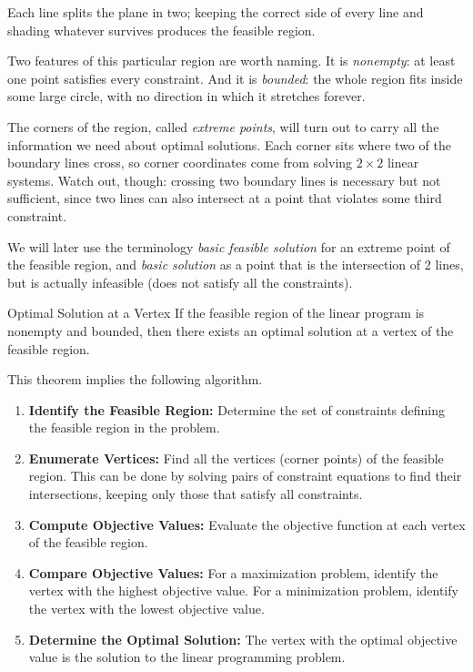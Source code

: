 Each line splits the plane in two; keeping the correct side of every line and shading whatever survives produces the feasible region.

Two features of this particular region are worth naming.  It is \emph{nonempty}: at least one point satisfies every constraint.  And it is \emph{bounded}: the whole region fits inside some large circle, with no direction in which it stretches forever.

The corners of the region, called \emph{extreme points}, will turn out to carry all the information we need about optimal solutions.  Each corner sits where two of the boundary lines cross, so corner coordinates come from solving $2 \times 2$ linear systems.  Watch out, though: crossing two boundary lines is necessary but not sufficient, since two lines can also intersect at a point that violates some third constraint.

We will later use the terminology \emph{basic feasible solution} for an extreme point of the feasible region, and \emph{basic solution} as a point that is the intersection of 2 lines, but is actually infeasible (does not satisfy all the constraints).

\begin{theorem}{Optimal Solution at a Vertex}\label{thm:optimalextremepoint}
If the feasible region of the linear program is nonempty and bounded, then there exists an optimal solution at a vertex of the feasible region.
\end{theorem}

This theorem implies the following algorithm.
\begin{algorithm}[H]
\caption{Enumerate Vertices Algorithm for Solving a Linear Programming Problem}
\label{alg:EnumerateVertices}
\begin{enumerate}
    \item \textbf{Identify the Feasible Region:}
    Determine the set of constraints defining the feasible region in the problem.
    \item \textbf{Enumerate Vertices:}
    Find all the vertices (corner points) of the feasible region. This can be done by solving pairs of constraint equations to find their intersections, keeping only those that satisfy all constraints.
    \item \textbf{Compute Objective Values:}
    Evaluate the objective function at each vertex of the feasible region.
    \item \textbf{Compare Objective Values:}
    For a maximization problem, identify the vertex with the highest objective value. For a minimization problem, identify the vertex with the lowest objective value.
    \item \textbf{Determine the Optimal Solution:}
    The vertex with the optimal objective value is the solution to the linear programming problem.
\end{enumerate}
\end{algorithm}

